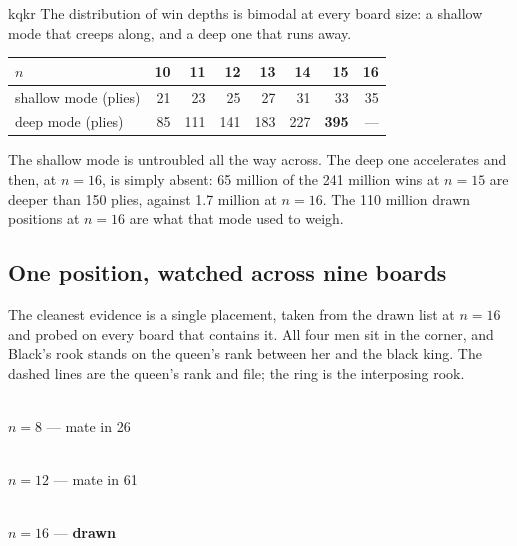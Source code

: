 \documentclass[11pt]{article}
\begin{document}
\begin{result}[title={The class is visible in the depth histogram}]{kqkr}
The distribution of win depths is bimodal at every board size: a shallow mode
that creeps along, and a deep one that runs away.

\smallskip
\begin{center}\small
\begin{tabular}{@{}lrrrrrrr@{}}
\toprule
$n$ & 10 & 11 & 12 & 13 & 14 & 15 & 16 \\
\midrule
shallow mode (plies) & 21 & 23 & 25 & 27 & 31 & 33 & 35 \\
deep mode (plies)    & 85 & 111 & 141 & 183 & 227 & \textbf{395} & --- \\
\bottomrule
\end{tabular}
\end{center}

\smallskip
The shallow mode is untroubled all the way across. The deep one accelerates and
then, at $n=16$, is simply absent: 65 million of the 241 million wins at $n=15$
are deeper than 150 plies, against 1.7 million at $n=16$. The 110 million drawn
positions at $n=16$ are what that mode used to weigh.
\end{result}

\subsection{One position, watched across nine boards}\label{sub:kqkr-oneposition}

The cleanest evidence is a single placement, taken from the drawn list at
$n=16$ and probed on every board that contains it. All four men sit in the
corner, and Black's rook stands on the queen's rank between her and the black
king. The dashed lines are the queen's rank and file; the ring is the
interposing rook.

\begin{center}
\begin{minipage}[b]{0.20\textwidth}\centering
  \\[1.5mm]
  {\small\color{kqkr}$n=8$ --- mate in 26}
\end{minipage}\hfill
\begin{minipage}[b]{0.29\textwidth}\centering
  \\[1.5mm]
  {\small\color{kqkr}$n=12$ --- mate in 61}
\end{minipage}\hfill
\begin{minipage}[b]{0.39\textwidth}\centering
  \\[1.5mm]
  {\small\color{kqkr}$n=16$ --- \textbf{drawn}}
\end{minipage}
\end{center}
\end{document}
